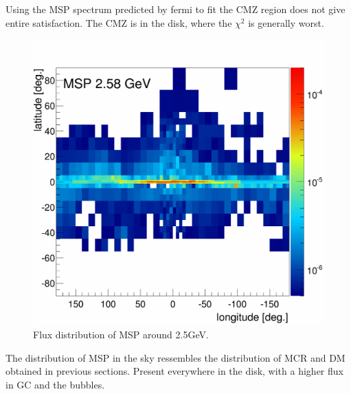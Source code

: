 Using the MSP spectrum predicted by fermi   to fit the CMZ region does not give entire satisfaction. The CMZ is in the disk, where the $\chi^2$ is generally worst.



\begin{figure}
  \centering
  \includegraphics[width=.9\linewidth]{pic/results/MSPonly_MSP_fluxE12_skymap.png}
  \caption{Flux distribution of MSP around 2.5GeV.}
  \label{fig:MSP_only_CMZ}
\end{figure}

The distribution of MSP in the sky ressembles the distribution of MCR and DM obtained in previous sections. Present everywhere in the disk, with a higher flux in GC and the bubbles.






















